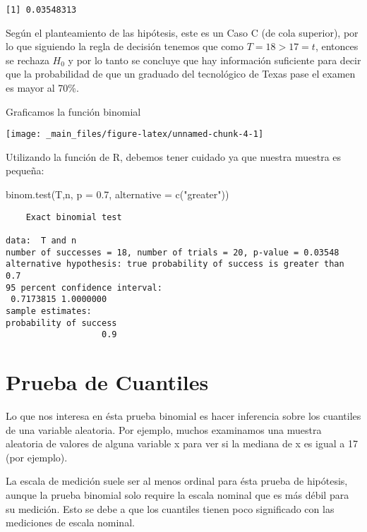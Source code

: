 \documentclass[
  a4paper,
  oneside,
  openany]{book}
\newenvironment{Shaded}{\begin{snugshade}}{\end{snugshade}}
\newcommand{\AttributeTok}[1]{\textcolor[rgb]{0.77,0.63,0.00}{#1}}
\newcommand{\FloatTok}[1]{\textcolor[rgb]{0.00,0.00,0.81}{#1}}
\newcommand{\FunctionTok}[1]{\textcolor[rgb]{0.00,0.00,0.00}{#1}}
\newcommand{\NormalTok}[1]{#1}
\newcommand{\StringTok}[1]{\textcolor[rgb]{0.31,0.60,0.02}{#1}}
\begin{document}
\begin{verbatim}
[1] 0.03548313
\end{verbatim}

Según el planteamiento de las hipótesis, este es un Caso C (de cola superior), por lo que siguiendo la regla de decisión tenemos que como \(T=18>17=t\), entonces se rechaza \(H_0\) y por lo tanto se concluye que hay información suficiente para decir que la probabilidad de que un graduado del tecnológico de Texas pase el examen es mayor al 70\%.

Graficamos la función binomial

\begin{center}\texttt{[image: \_main\_files/figure-latex/unnamed-chunk-4-1]} \end{center}

Utilizando la función de R, debemos tener cuidado ya que nuestra muestra es pequeña:

\begin{Shaded}
\begin{Highlighting}[]
\FunctionTok{binom.test}\NormalTok{(T,n, }\AttributeTok{p =} \FloatTok{0.7}\NormalTok{, }\AttributeTok{alternative =} \FunctionTok{c}\NormalTok{(}\StringTok{"greater"}\NormalTok{))}
\end{Highlighting}
\end{Shaded}

\begin{verbatim}
    Exact binomial test

data:  T and n
number of successes = 18, number of trials = 20, p-value = 0.03548
alternative hypothesis: true probability of success is greater than 0.7
95 percent confidence interval:
 0.7173815 1.0000000
sample estimates:
probability of success 
                   0.9 
\end{verbatim}

\hypertarget{prueba-de-cuantiles}{%
\chapter{Prueba de Cuantiles}\label{prueba-de-cuantiles}}

Lo que nos interesa en ésta prueba binomial es hacer inferencia sobre los cuantiles de una variable aleatoria. Por ejemplo, muchos examinamos una muestra aleatoria de valores de alguna variable x para ver si la mediana de x es igual a 17 (por ejemplo).

La escala de medición suele ser al menos ordinal para ésta prueba de hipótesis, aunque la prueba binomial solo require la escala nominal que es más débil para su medición. Esto se debe a que los cuantiles tienen poco significado con las mediciones de escala nominal.
\end{document}
